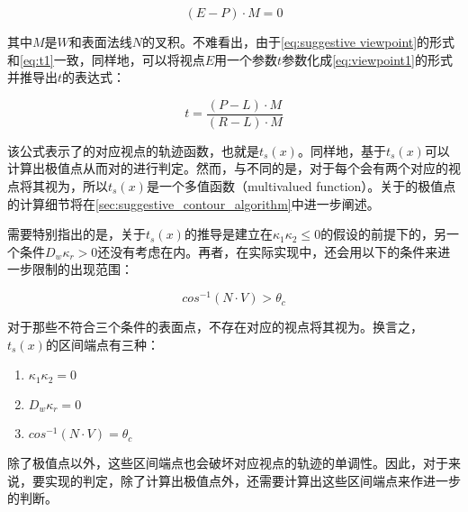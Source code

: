 \begin{equation}\label{eq:suggestive viewpoint}
    {(E - P)}\cdot{M} = 0
\end{equation}

其中$M$是$W$和表面法线$N$的叉积。不难看出，由于\autoref{eq:suggestive viewpoint}的形式和\autoref{eq:t1}一致，同样地，可以将视点$E$用一个参数$t$参数化成\autoref{eq:viewpoint1}的形式并推导出$t$的表达式：

\begin{equation}\label{eq:suggestive trajectory}
    t = \frac{(P-L)\cdot{M}}{(R-L)\cdot{M}}
\end{equation}

该公式表示了\scon{}的对应视点的轨迹函数，也就是$t_s(x)$。同样地，基于$t_s(x)$可以计算出极值点从而对\scon{}的\epsl{}进行判定。然而，与\con{}不同的是，对于每个\sconp{}会有两个对应的视点将其视为\sconp{}，所以$t_s(x)$是一个多值函数（multivalued function）。关于\scon{}的极值点的计算细节将在\ref{sec:suggestive_contour_algorithm}中进一步阐述。

需要特别指出的是，关于$t_s(x)$的推导是建立在$\kappa_1\kappa_2 \leq 0$的假设的前提下的，另一个条件$D_w\kappa_r>0$还没有考虑在内。再者，在实际实现中，还会用以下的条件来进一步限制\scon{}的出现范围：

\begin{equation}\label{eq:cosNdotV}
  cos^{-1}(N\cdot{V}) > \theta_c 
\end{equation}

对于那些不符合三个条件的表面点，不存在对应的视点将其视为\sconp{}。换言之，$t_s(x)$的区间端点有三种：

\begin{enumerate}
\item $\kappa_1\kappa_2 = 0$
\item $D_w\kappa_r = 0$
\item $cos^{-1}(N\cdot{V}) = \theta_c$
\end{enumerate}

除了极值点以外，这些区间端点也会破坏对应视点的轨迹的单调性。因此，对于\scon{}来说，要实现\epsl{}的判定，除了计算出极值点外，还需要计算出这些区间端点来作进一步的判断。